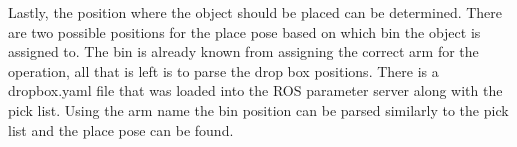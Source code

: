 \documentclass{article}
\begin{document}
Lastly, the position where the object should be placed can be determined. There are two possible positions for the place pose based on which bin the object is assigned to. The bin is already known from assigning the correct arm for the operation, all that is left is to parse the drop box positions. There is a dropbox.yaml file that was loaded into the ROS parameter server along with the pick list. Using the arm name the bin position can be parsed similarly to the pick list and the place pose can be found.

\end{document}
